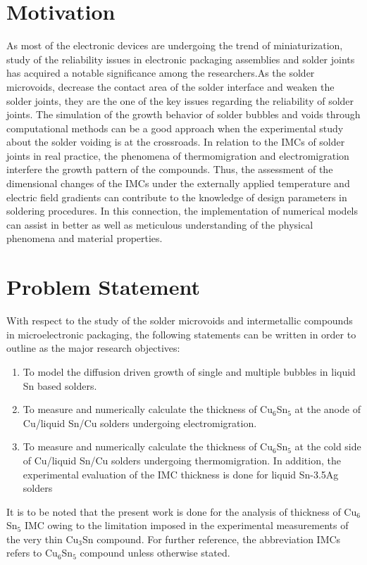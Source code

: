 \section{Motivation}\label{Chap1_01}
As most of the electronic devices are undergoing the trend of miniaturization, study of the reliability issues in electronic packaging assemblies and solder joints has acquired a notable significance among the researchers.As the solder microvoids, decrease the contact area of the solder interface and weaken the solder joints, they are the one of the key issues regarding the reliability of solder joints. The simulation of the growth behavior of solder bubbles and voids through computational methods can be a good approach when the experimental study about the solder voiding is at the crossroads. In relation to the IMCs of solder joints in real practice, the phenomena of thermomigration and electromigration interfere the growth pattern of the compounds. Thus, the assessment of the dimensional changes of the IMCs under the externally applied temperature  and electric field  gradients can contribute to the knowledge of design parameters in soldering procedures. In this connection, the implementation of numerical models can assist in better  as well as meticulous understanding of the physical phenomena and material properties.

\section{Problem Statement}\label{Chap1_01}
With respect to the study of the solder microvoids and intermetallic compounds in microelectronic packaging, the following statements can be written in order to outline as the major research objectives:
\begin{enumerate}
\item To model the diffusion driven growth of single and multiple bubbles in liquid Sn based solders. 
\item To measure and numerically calculate the thickness of Cu$_6$Sn$_5$ at the anode of Cu/liquid Sn/Cu solders undergoing electromigration.
\item To measure and numerically calculate the thickness of Cu$_6$Sn$_5$ at the cold side of Cu/liquid Sn/Cu solders undergoing thermomigration. In addition, the experimental evaluation of the IMC thickness is done for liquid Sn-3.5Ag solders
\end{enumerate}

It is to be noted that the present work is done for the analysis of thickness of Cu$_6$Sn$_5$ IMC owing to the limitation imposed in the experimental measurements of the very thin Cu$_3$Sn compound. For further reference, the abbreviation IMCs refers to Cu$_6$Sn$_5$ compound unless otherwise stated. 

